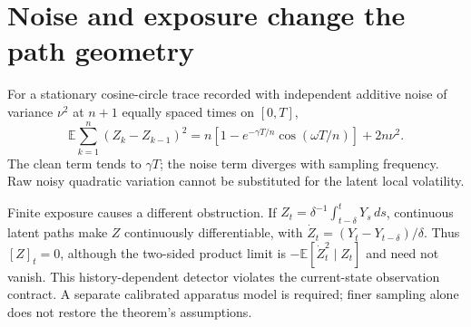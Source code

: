 \section{Noise and exposure change the path geometry}
For a stationary cosine-circle trace recorded with independent additive noise
of variance $\nu^2$ at $n+1$ equally spaced times on $[0,T]$,
\[
 \mathbb E\sum_{k=1}^{n}(Z_k-Z_{k-1})^2
 =n[1-e^{-\gamma T/n}\cos(\omega T/n)]+2n\nu^2.
\]
The clean term tends to $\gamma T$; the noise term diverges with sampling
frequency. Raw noisy quadratic variation cannot be substituted for the
latent local volatility.

Finite exposure causes a different obstruction. If
$Z_t=\delta^{-1}\int_{t-\delta}^tY_s\,ds$, continuous latent paths make $Z$
continuously differentiable, with
$\dot Z_t=(Y_t-Y_{t-\delta})/\delta$. Thus $[Z]_t=0$, although the two-sided
product limit is $-\mathbb E[\dot Z_t^2\mid Z_t]$ and need not vanish.
This history-dependent detector violates the current-state observation
contract. A separate calibrated apparatus model is required; finer sampling
alone does not restore the theorem's assumptions.
